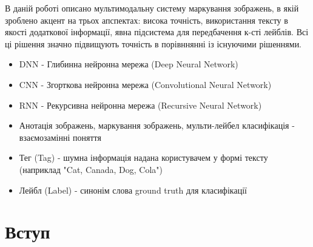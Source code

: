 \documentclass{udstu}
\begin{document}


\abstractUkr

В даній роботі описано мультимодальну систему маркування зображень, в якій зроблено акцент на трьох апспектах:
висока точність, використання тексту в якості додаткової інформації, явна підсистема для передбачення к-сті лейблів.
Всі ці рішення значно підвищують точність в порівннянні із існуючими рішеннями.

\shortings

\begin{itemize}[*]
	\item DNN - Глибинна нейронна мережа (Deep Neural Network)
	\item CNN - Згорткова нейронна мережа (Convolutional Neural Network)
	\item RNN - Рекурсивна нейронна мережа (Recursive Neural Network)
	\item Анотація зображень, маркування зображень, мульти-лейбел класифікація - взаємозамінні поняття
	\item Тег (Tag) - шумна інформація надана користувачем у формі тексту (наприклад "Cat, Canada, Dog, Cola")
	\item Лейбл (Label) - синонім слова ground truth для класифікації
\end{itemize}


\tableofcontents


\chapter{Вступ}
\end{document}

